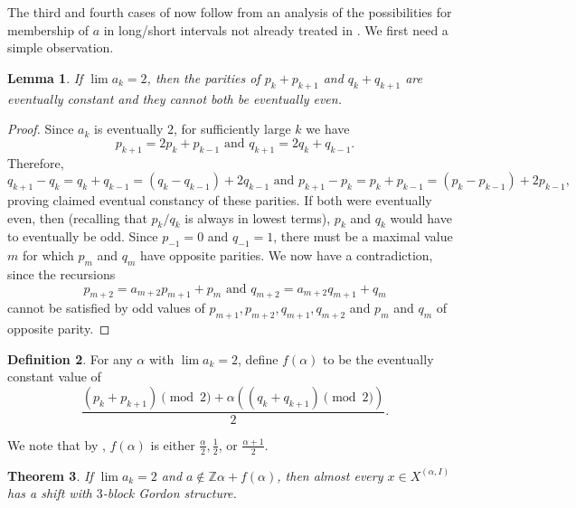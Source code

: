 \documentclass[11pt,reqno]{amsart}
\newtheorem{theorem}{Theorem}[section]
\newtheorem{lemma}[theorem]{Lemma}
\theoremstyle{definition}
\newtheorem{definition}[theorem]{Definition}
\theoremstyle{plain}
\begin{document}
The third and fourth cases of  now follow from an analysis of the possibilities for membership of $a$ in long/short intervals not already treated in . We first need a simple observation.

\begin{lemma}\label{parity}
If $\lim a_k = 2$, then the parities of $p_k + p_{k+1}$ and $q_k + q_{k+1}$ are eventually constant and they cannot both be eventually even.
\end{lemma}

\begin{proof}
Since $a_k$ is eventually $2$, for sufficiently large $k$ we have 
\[
p_{k+1} = 2p_k + p_{k-1} \textrm{ and } q_{k+1} = 2q_k + q_{k-1}.
\]
Therefore, 
\[
q_{k+1} - q_k = q_k + q_{k-1} = (q_k - q_{k-1}) + 2q_{k-1} \textrm{ and } p_{k+1} - p_k = p_k + p_{k-1} = (p_k - p_{k-1}) + 2p_{k-1},
\]
proving claimed eventual constancy of these parities. If both were eventually even, then (recalling that $p_k/q_k$ is always in lowest terms), $p_k$ and $q_k$ would have to eventually be odd. Since $p_{-1} = 0$ and $q_{-1} = 1$, there must be a maximal value $m$ for which $p_m$ and $q_m$ have opposite parities. We now have a contradiction, since the recursions
\[
p_{m+2} = a_{m+2} p_{m+1} + p_m \textrm{ and } q_{m+2} = a_{m+2} q_{m+1} + q_m
\]
cannot be satisfied by odd values of $p_{m+1}, p_{m+2}, q_{m+1}, q_{m+2}$ and $p_m$ and $q_m$ of opposite parity.

\end{proof}

\begin{definition}\label{fdef}
For any $\alpha$ with $\lim a_k = 2$, define $f(\alpha)$ to be the eventually constant value of
\[
\frac{(p_k + p_{k+1}) \pmod 2 + \alpha ((q_k + q_{k+1}) \pmod 2)}{2}.
\]
\end{definition}
We note that by , $f(\alpha)$ is either $\frac{\alpha}{2}, \frac{1}{2}$, or $\frac{\alpha+1}{2}$. 

\begin{theorem}\label{case3}
If $\lim a_k = 2$ and $a \notin \mathbb{Z}\alpha + f(\alpha)$, then almost every $x \in X^{(\alpha, I)}$ has a shift with $3$-block Gordon structure.
\end{theorem}
\end{document}
